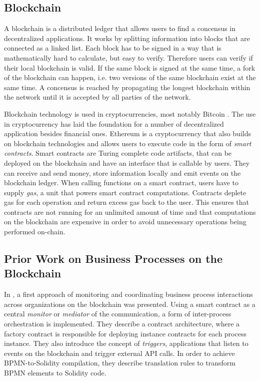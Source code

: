 \documentclass[runningheads]{llncs}
\begin{document}
\subsection{Blockchain}
A blockchain is a distributed ledger that allows users to find a concensus in decentralized applications.
It works by splitting information into blocks that are connected as a linked list.
Each block has to be signed in a way that is mathematically hard to calculate, but easy to verify.
Therefore users can verify if their local blockchain is valid.
If the same block is signed at the same time, a fork of the blockchain can happen, i.e. two versions of the same blockchain exist at the same time.
A concensus is reached by propagating the longest blockchain within the network until it is accepted by all parties of the network.

Blockchain technology is used in cryptocurrencies, most notably Bitcoin \cite{nakamoto2008bitcoin}.
The use in cryptocurrency has laid the foundation for a number of decentralized application besides financial ones.
Ethereum \cite{wood2014ethereum} is a cryptocurrency that also builds on blockchain technologies and allows users to execute code in the form of \emph{smart contracts}.
Smart contracts are Turing complete code artifacts, that can be deployed on the blockchain and have an interface that is callable by users.
They can receive and send money, store information locally and emit events on the blockchain ledger.
When calling functions on a smart contract, users have to supply \emph{gas}, a unit that powers smart contract computations.
Contracts deplete gas for each operation and return excess gas back to the user.
This ensures that contracts are not running for an unlimited amount of time and that computations on the blockchain are expensive in order to avoid unnecessary operations being performed on-chain.

\subsection{Prior Work on Business Processes on the Blockchain}
In \cite{weber2016untrusted}, a first approach of monitoring and coordinating business process interactions across organizations on the blockchain was presented.
Using a smart contract as a central \emph{monitor} or \emph{mediator} of the communication, a form of inter-process orchestration is implemented.
They describe a contract architecture, where a factory contract is responsible for deploying instance contracts for each process instance.
They also introduce the concept of \emph{triggers}, applications that listen to events on the blockchain and trigger external API calls.
In order to achieve BPMN-to-Solidity compilation, they describe translation rules to transform BPMN elements to Solidity code.
\end{document}
